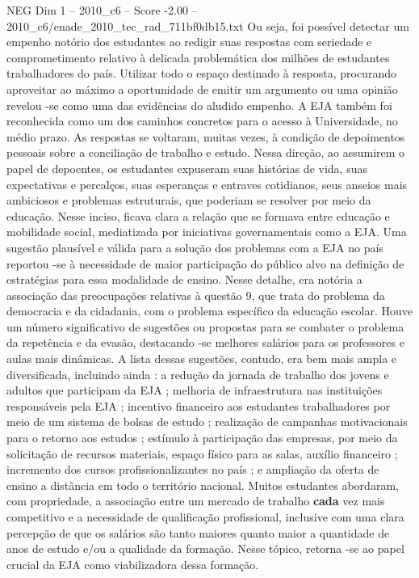 \begin{textsample}{NEG Dim 1 – 2010\_c6 – Score -2.00 – 2010\_c6/enade\_2010\_tec\_rad\_711bf0db15.txt}
Ou seja, foi possível detectar um empenho notório dos estudantes ao redigir suas respostas com seriedade e comprometimento relativo à delicada problemática dos milhões de estudantes trabalhadores do país.
Utilizar todo o espaço destinado à resposta, procurando aproveitar ao máximo a oportunidade de emitir um argumento ou uma opinião revelou -se como uma das evidências do aludido empenho.
A EJA também foi reconhecida como um dos caminhos concretos para o acesso à Universidade, no médio prazo.
As respostas se voltaram, muitas vezes, à condição de depoimentos pessoais sobre a conciliação de trabalho e estudo.
Nessa direção, ao assumirem o papel de depoentes, os estudantes expuseram suas histórias de vida, suas expectativas e percalços, suas esperanças e entraves cotidianos, seus anseios mais ambiciosos e problemas estruturais, que poderiam se resolver por meio da educação.
Nesse inciso, ficava clara a relação que se formava entre educação e mobilidade social, mediatizada por iniciativas governamentais como a EJA.
Uma sugestão plausível e válida para a solução dos problemas com a EJA no país reportou -se à necessidade de maior participação do público alvo na definição de estratégias para essa modalidade de ensino.
Nesse detalhe, era notória a associação das preocupações relativas à questão 9, que trata do problema da democracia e da cidadania, com o problema específico da educação escolar.
Houve um número significativo de sugestões ou propostas para se combater o problema da repetência e da evasão, destacando -se melhores salários para os professores e aulas mais dinâmicas.
A lista dessas sugestões, contudo, era bem mais ampla e diversificada, incluindo ainda : a redução da jornada de trabalho dos jovens e adultos que participam da EJA ; melhoria de infraestrutura nas instituições responsáveis pela EJA ; incentivo financeiro aos estudantes trabalhadores por meio de um sistema de bolsas de estudo ; realização de campanhas motivacionais para o retorno aos estudos ; estímulo à participação das empresas, por meio da solicitação de recursos materiais, espaço físico para as salas, auxílio financeiro ; incremento dos cursos profissionalizantes no país ; e ampliação da oferta de ensino a distância em todo o território nacional.
Muitos estudantes abordaram, com propriedade, a associação entre um mercado de trabalho \textbf{cada} vez mais competitivo e a necessidade de qualificação profissional, inclusive com uma clara percepção de que os salários são tanto maiores quanto maior a quantidade de anos de estudo e/ou a qualidade da formação.
Nesse tópico, retorna -se ao papel crucial da EJA como viabilizadora dessa formação.

\end{textsample}
